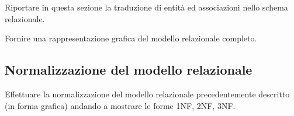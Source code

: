 \begin{templateblock}
    Riportare in questa sezione la traduzione di entità ed associazioni
    nello schema relazionale.

    Fornire una rappresentazione grafica del modello relazionale completo.
\end{templateblock}

\subsection*{Normalizzazione del modello relazionale}

\begin{templateblock}
    Effettuare la normalizzazione del modello relazionale precedentemente
    descritto (in forma grafica) andando a mostrare le forme 1NF, 2NF, 3NF.
\end{templateblock}
